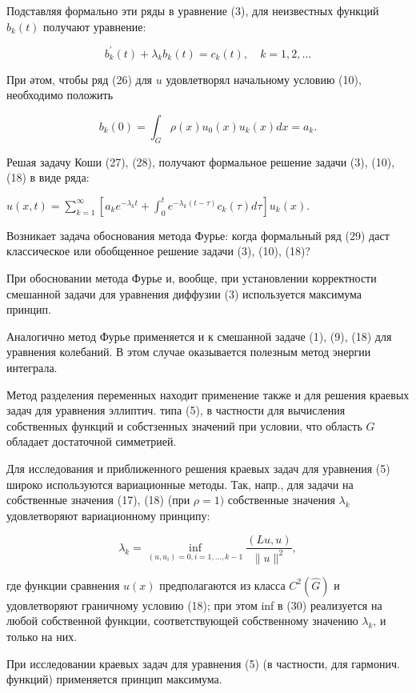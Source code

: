\documentclass[10pt]{article}
\begin{document}
Подставляя формально эти ряды в уравнение (3), для неизвестных функций $b_{k}(t)$ получают уравнение:



\[

b_{k}^{\prime}(t)+\lambda_{k} b_{k}(t)=c_{k}(t), \quad k=1,2, \ldots

\]



При әтом, чтобы ряд (26) для $u$ удовлетворял начальному условию (10), необходимо положить



\[

b_{k}(0)=\int_{G} \rho(x) u_{0}(x) u_{k}(x) d x=a_{k} .

\]



Решая задачу Коши (27), (28), получают формальное решение задачи (3), (10), (18) в виде ряда:



$u(x, t)=\sum_{k=1}^{\infty}\left[a_{k} e^{-\lambda_{k} t}+\int_{0}^{t} e^{-\lambda_{k}(t-\tau)} c_{k}(\tau) d \tau\right] u_{k}(x)$.



Возникает задача обоснования метода Фурье: когда формальный ряд (29) даст классическое или обобщенное решение задачи (3), (10), (18)?



При обосновании метода Фурье и, вообще, при установлении корректности смешанной задачи для уравнения диффузии (3) используется максимума принцип.



Аналогично метод Фурье применяется и к смешанной задаче (1), (9), (18) для уравнения колебаний. В этом случае оказывается полезным метод энергии интеграла.



Метод разделения переменных находит применение также и для решения краевых задач для уравнения эллиптич. типа (5), в частности для вычисления собственных функций и собстзенных значений при условии, что область $G$ обладает достаточной симметрией.



Для исследования и приближенного решения краевых задач для уравнения (5) широко используются вариационные методы. Так, напр., для задачи на собственные значения (17), (18) (при $\rho=1)$ собственные значения $\lambda_{k}$ удовлетворяют вариационному принципу:



\[

\lambda_{k}=\inf _{\left(u, u_{i}\right)=0, i=1, \ldots, k-1} \frac{(L u, u)}{\|u\|^{2}},

\]



где функции сравнения $u(x)$ предполагаются из класса $C^{2}(\hat{G})$ и удовлетворяют граничному условию (18); при этом inf в (30) реализуется на любой собственной функции, соответствующей собственному значению $\lambda_{k}$, и только на них.



При исследовании краевых задач для уравнения (5) (в частности, для гармонич. функций) применяется принцип максимума.
\end{document}
